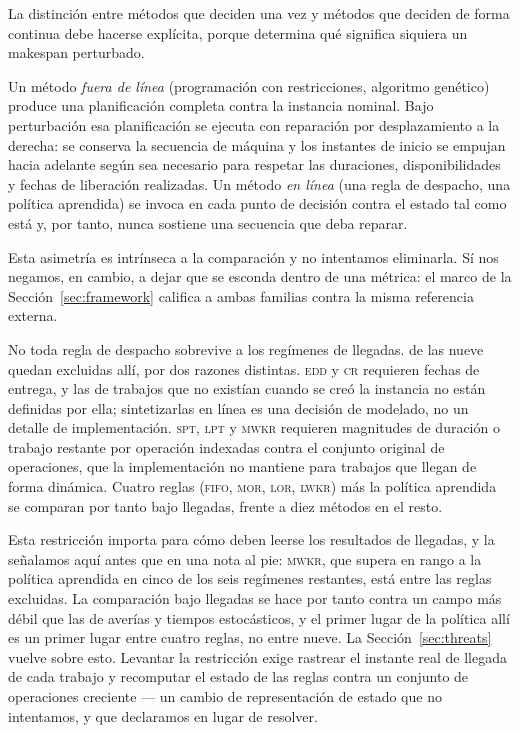 \documentclass[a4paper,fleqn]{cas-sc}
\begin{document}
La distinción entre métodos que deciden una vez y métodos que deciden de forma
continua debe hacerse explícita, porque determina qué significa siquiera un
makespan perturbado.

Un método \emph{fuera de línea} (programación con restricciones, algoritmo
genético) produce una planificación completa contra la instancia nominal. Bajo
perturbación esa planificación se ejecuta con reparación por desplazamiento a la
derecha: se conserva la secuencia de máquina y los instantes de inicio se
empujan hacia adelante según sea necesario para respetar las duraciones,
disponibilidades y fechas de liberación realizadas. Un método \emph{en línea}
(una regla de despacho, una política aprendida) se invoca en cada punto de
decisión contra el estado tal como está y, por tanto, nunca sostiene una
secuencia que deba reparar.

Esta asimetría es intrínseca a la comparación y no intentamos eliminarla. Sí
nos negamos, en cambio, a dejar que se esconda dentro de una métrica: el marco
de la Sección~\ref{sec:framework} califica a ambas familias contra la misma
referencia externa.

No toda regla de despacho sobrevive a los regímenes de llegadas.
\NExcludedArr{} de las nueve quedan excluidas allí, por dos razones distintas.
\textsc{edd} y \textsc{cr} requieren fechas de entrega, y las de trabajos que no
existían cuando se creó la instancia no están definidas por ella; sintetizarlas
en línea es una decisión de modelado, no un detalle de implementación.
\textsc{spt}, \textsc{lpt} y \textsc{mwkr} requieren magnitudes de duración o
trabajo restante por operación indexadas contra el conjunto original de
operaciones, que la implementación no mantiene para trabajos que llegan de forma
dinámica. Cuatro reglas (\textsc{fifo}, \textsc{mor}, \textsc{lor},
\textsc{lwkr}) más la política aprendida se comparan por tanto bajo llegadas,
frente a diez métodos en el resto.

Esta restricción importa para cómo deben leerse los resultados de llegadas, y la
señalamos aquí antes que en una nota al pie: \textsc{mwkr}, que supera en rango
a la política aprendida en cinco de los seis regímenes restantes, está entre las
reglas excluidas. La comparación bajo llegadas se hace por tanto contra un campo
más débil que las de averías y tiempos estocásticos, y el primer lugar de la
política allí es un primer lugar entre cuatro reglas, no entre nueve. La
Sección~\ref{sec:threats} vuelve sobre esto. Levantar la restricción exige
rastrear el instante real de llegada de cada trabajo y recomputar el estado de
las reglas contra un conjunto de operaciones creciente --- un cambio de
representación de estado que no intentamos, y que declaramos en lugar de
resolver.
\end{document}
